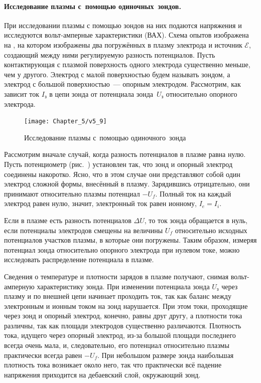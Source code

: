 \paragraph{Исследование плазмы с~помощью одиночных~зондов.}

При исследовании плазмы с помощью зондов на них подаются напряжения и
исследуются вольт-амперные
характеристики (ВАХ). Схема опытов изображена на , на котором изображены два погружённых в плазму электрода и
источник $\mathcal{E}$, создающий между ними регулируемую разность потенциалов.
Пусть контактирующая с плазмой поверхность одного
электрода существенно меньше, чем у другого. Электрод с малой поверхностью будем
называть зондом, а электрод с большой
поверхностью~--- опорным электродом. Рассмотрим, как зависит ток $I_з$ в цепи
зонда от потенциала зонда~$U_з$
относительно опорного электрода.

\begin{figure}[h]
	\centering
	\texttt{[image: Chapter\_5/v5\_9]}
	\caption{Исследование плазмы с~помощью одиночного~зонда}
\end{figure}

Рассмотрим вначале случай, когда разность потенциалов в плазме равна нулю.
Пусть потенциометр (рис.~) установлен
так, что зонд и опорный электрод соединены накоротко.
Ясно, что в этом случае они представляют собой один электрод сложной формы,
внесённый в плазму. Зарядившись отрицательно, они принимают относительно
плазмы потенциал $-U_f$. Полный ток на каждый электрод равен нулю, значит,
электронный ток равен ионному, $I_e=I_i$.

Если в плазме есть разность потенциалов $\Delta U$,
то ток зонда обращается в нуль, если потенциалы электродов
смещены на величины $U_f$ относительно исходных потенциалов
участков плазмы, в которые они погружены.
Таким образом, измеряя потенциал зонда относительно опорного электрода при нулевом
токе, можно исследовать распределение потенциала в плазме.

Сведения о температуре и плотности зарядов в плазме получают, снимая
вольт-амперную характеристику зонда.
При изменении потенциала зонда $U_з$ через плазму и по внешней цепи
начинает проходить ток, так как баланс между электронным и ионным током на зонд
нарушается. При этом токи, проходящие через зонд и опорный электрод, конечно,
равны друг другу, а плотности тока различны, так как площади
электродов существенно различаются.
Плотность тока, идущего через опорный электрод, из-за большой площади последнего
всегда очень мала, и, следовательно, его потенциал относительно плазмы
практически всегда равен $-U_f$. При небольшом размере зонда наибольшая
плотность тока возникает около него, так что практически всё падение напряжения
приходится на дебаевский слой, окружающий зонд.

